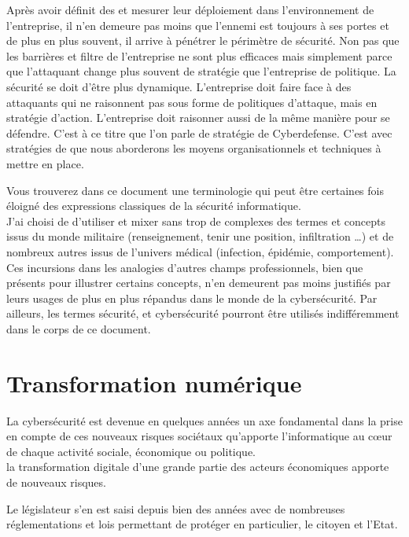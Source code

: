 Après avoir définit des  et mesurer leur déploiement dans l’environnement de l’entreprise, il n’en demeure pas moins que l’ennemi est toujours à ses portes et de plus en plus souvent, il arrive à pénétrer le périmètre de sécurité.
Non pas que les barrières et filtre de l'entreprise ne sont plus efficaces mais simplement parce que l'attaquant change plus souvent de stratégie que l'entreprise de politique. La sécurité se doit d'être plus dynamique.
L’entreprise doit faire face à des attaquants qui ne raisonnent pas sous forme de politiques d’attaque, mais en stratégie d'action. L’entreprise doit raisonner aussi de la même manière pour se défendre. C'est à ce titre que l'on parle de stratégie de Cyberdefense.
C'est avec stratégies de  que nous aborderons les moyens organisationnels et techniques à mettre en place.

Vous trouverez  dans ce document une terminologie qui peut être certaines fois éloigné des expressions classiques de la sécurité informatique. \\
J'ai choisi de d'utiliser et mixer sans trop de complexes des termes et concepts issus du monde militaire (renseignement, tenir une position, infiltration …) et de nombreux autres issus de l'univers médical (infection, épidémie, comportement).\\ Ces incursions dans les analogies d'autres champs professionnels, bien que présents pour illustrer certains concepts, n'en demeurent pas moins justifiés par leurs usages de plus en plus répandus dans le monde de la cybersécurité. Par ailleurs, les termes sécurité, et cybersécurité pourront être utilisés indifféremment dans le corps de ce document.

\section {Transformation numérique}


La cybersécurité est devenue en quelques années un axe fondamental dans la prise en compte de ces nouveaux risques sociétaux qu'apporte l'informatique au cœur de chaque activité sociale, économique ou politique. \\
la transformation digitale d'une grande partie des acteurs économiques apporte de nouveaux risques. 

Le législateur s'en est saisi depuis bien des années avec de nombreuses réglementations et lois permettant de protéger en particulier, le citoyen et l'Etat.

